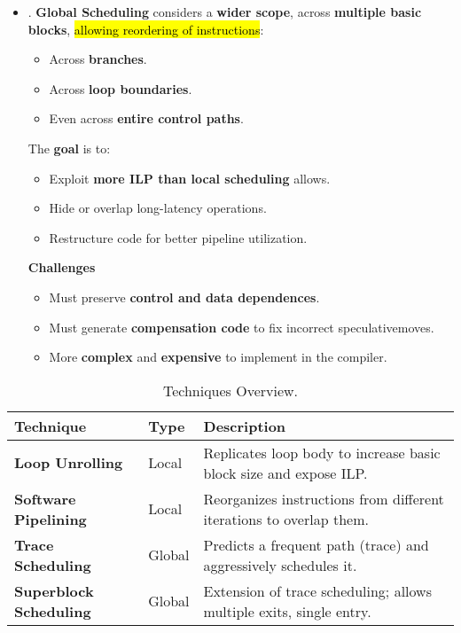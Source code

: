 \begin{itemize}
    \item {}. \textbf{Global Scheduling} considers a \textbf{wider scope}, across \textbf{multiple basic blocks}, \hl{allowing reordering of instructions}:
    \begin{itemize}
        \item Across \textbf{branches}.
        \item Across \textbf{loop boundaries}.
        \item Even across \textbf{entire control paths}.
    \end{itemize}
    \textcolor{Green3}{} The \textcolor{Green3}{\textbf{goal}} is to:
    \begin{itemize}
        \item Exploit \textbf{more ILP than local scheduling} allows.
        \item Hide or overlap long-latency operations.
        \item Restructure code for better pipeline utilization.
    \end{itemize}
    \textcolor{Red2}{ \textbf{Challenges}}
    \begin{itemize}
        \item Must preserve \textbf{control and data dependences}.
        \item Must generate \textbf{compensation code} to fix incorrect speculative\break moves.
        \item More \textbf{complex} and \textbf{expensive} to implement in the compiler.
    \end{itemize}
\end{itemize}

\begin{table}[!htp]
    \centering
    \begin{tabular}{@{} l l p{17em} @{}}
        \toprule
        Technique & Type & Description \\
        \midrule
        \textbf{Loop Unrolling}         & Local     & Replicates loop body to increase basic block size and expose ILP.     \\ [.5em]
        \textbf{Software Pipelining}    & Local     & Reorganizes instructions from different iterations to overlap them.   \\ [.5em]
        \textbf{Trace Scheduling}       & Global    & Predicts a frequent path (trace) and aggressively schedules it.       \\ [.5em]
        \textbf{Superblock Scheduling}  & Global    & Extension of trace scheduling; allows multiple exits, single entry.   \\
        \bottomrule
    \end{tabular}
    \caption{Techniques Overview.}
\end{table}